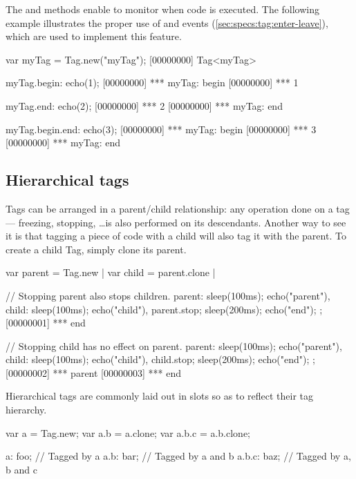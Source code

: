 The  and  methods enable to monitor when code is
executed.  The following example illustrates the proper use of
 and  events
(\autoref{sec:specs:tag:enter-leave}), which are used to implement this
feature.

\begin{urbiscript}
var myTag = Tag.new("myTag");
[00000000] Tag<myTag>

myTag.begin: echo(1);
[00000000] *** myTag: begin
[00000000] *** 1

myTag.end: echo(2);
[00000000] *** 2
[00000000] *** myTag: end

myTag.begin.end: echo(3);
[00000000] *** myTag: begin
[00000000] *** 3
[00000000] *** myTag: end
\end{urbiscript}

\subsection{Hierarchical tags}

Tags can be arranged in a parent/child relationship: any operation done on a
tag --- freezing, stopping, \ldots is also performed on its descendants.
Another way to see it is that tagging a piece of code with a child will also
tag it with the parent. To create a child Tag, simply clone its parent.

\begin{urbiscript}
var parent = Tag.new |
var child = parent.clone |

// Stopping parent also stops children.
{
  parent: {sleep(100ms); echo("parent")},
  child:  {sleep(100ms); echo("child")},
  parent.stop;
  sleep(200ms);
  echo("end");
};
[00000001] *** end

// Stopping child has no effect on parent.
{
  parent: {sleep(100ms); echo("parent")},
  child:  {sleep(100ms); echo("child")},
  child.stop;
  sleep(200ms);
  echo("end");
};
[00000002] *** parent
[00000003] *** end
\end{urbiscript}

Hierarchical tags are commonly laid out in slots so as to reflect their tag
hierarchy.

\begin{urbiunchecked}
var a = Tag.new;
var a.b = a.clone;
var a.b.c = a.b.clone;

a:     foo; // Tagged by a
a.b:   bar; // Tagged by a and b
a.b.c: baz; // Tagged by a, b and c
\end{urbiunchecked}

